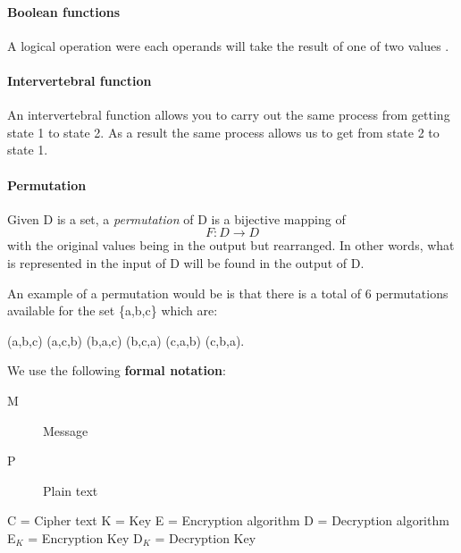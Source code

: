 \documentclass[11pt,a4paper]{report}
\begin{document}
\paragraph{Boolean functions}
A logical operation were each operands will take the result of one of two values \cite{Gregory2013Cryptanalysis}.

\paragraph{Intervertebral function}
An intervertebral function allows you to carry out the
same process from getting state 1 to state 2. As a result the same process
allows us to get from state 2 to state 1.

\paragraph{Permutation}
Given D is a set, a \emph{permutation} of D is a bijective mapping of 
\begin{displaymath}
F: D \rightarrow D
\end{displaymath}
with the original values being in the output but rearranged. In other words, what is represented in the input of D will be found in the output of D.

An example of a permutation would be is that there is a total of 6 permutations available for the set \{a,b,c\} which are: 
\begin{center}
(a,b,c) (a,c,b) (b,a,c) (b,c,a) (c,a,b) (c,b,a).
\end{center}


We use the following \textbf{formal notation}:
\begin{description}
\item[M] Message
\item[P] Plain text
\end{description}
C = Cipher text \newline
K = Key \newline
E = Encryption algorithm \newline
D = Decryption algorithm \newline
E$_{K}$ = Encryption Key \newline
D$_{K}$ = Decryption Key \newline
\end{document}
